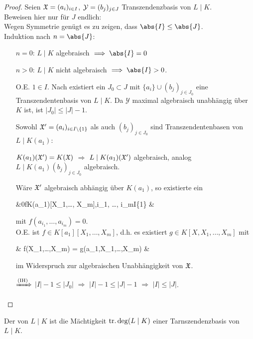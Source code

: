 \begin{proof}
	Seien $\mathfrak{X} = (a_i)_{i\in I}$, $\mathcal{Y} = (b_j)_{j \in J}$ Transzendenzbasis von $L \mid K$.\\ 
	Beweisen hier nur für $J$ endlich:\\
	Wegen Symmetrie genügt es zu zeigen, dass $\abs{I} \le \abs{J}$.\\
	Induktion nach $n = \abs{J}$:
	\begin{itemize}[topsep=-6pt,left=3em,itemsep=\lineskip,parsep=\lineskip]
		\item[$n =0$:] $L \mid K$ algebraisch $\implies \abs{I} = 0$
		\item[$n > 0$:] $L \mid K$ nicht algebraisch $\implies \abs{I} > 0$. %
		
		O.E. $1\in I$. Nach  existiert ein $J_0\subset J$ mit $\{a_i\}\cup (b_j)_{j\in J_0}$ eine Transzendentenbasis von $L\mid K$. Da $\mathcal Y$ maximal algebraisch unabhängig über $K$ ist, ist $\vert J_0\vert \le \vert J\vert - 1$.
		
		Sowohl $\mathfrak{X}' = (a_i)_{i\in I\setminus\{1\}}$ als auch $(b_j)_{j\in J_0}$ sind Transzendentenbasen von $L\mid K(a_1)$:
		\begin{adjustwidth}{0.75em}{-6pt}
		$K(a_1)(\mathfrak{X}') = K(\mathfrak{X})$ $\Rightarrow$ $L\mid K(a_1)(\mathfrak{X}')$ algebraisch, analog $L\mid K(a_1)(b_j)_{j\in J_0}$ algebraisch.
		
		Wäre $\mathfrak{X}'$ algebraisch abhängig über $K(a_1)$, so existierte ein \begin{flalign*}\qquad&0\neq f\in K(a_1)[X_1,\dots, X_m],\quad i_1, \dots, i_m\in I\setminus\{1\} &
		\end{flalign*}
		mit $f(a_{i_1},\dots,a_{i_m}) = 0$.\\
		O.E. ist $f\in K[a_1][X_1,\dots,X_m]$, d.h. es existiert $g\in K[X,X_1,\dots, X_m]$ mit
		\begin{flalign*}
			\qquad& f(X_1,\dots,X_m) = g(a_1,X_1,\dots,X_m) &
		\end{flalign*}
		im Widerspruch zur algebraischen Unabhängigkeit von $\mathfrak{X}$.
		\end{adjustwidth}
		
		$\xRightarrow{\text{(IH)}}$ $\vert I\vert -1 \le \vert J_0\vert$
		$\Rightarrow$ $\vert I\vert -1\le \vert J\vert -1$ $\Rightarrow$ $\vert I \vert\le \vert J\vert$.
	\end{itemize}
\end{proof}
\begin{definition}[Transzendenzgrad]
	Der  von $L \mid K$ ist die Mächtigkeit $\operatorname{tr.deg}(L\mid K)$ einer Tarnszendenzbasis von $L \mid K$.
\end{definition}
